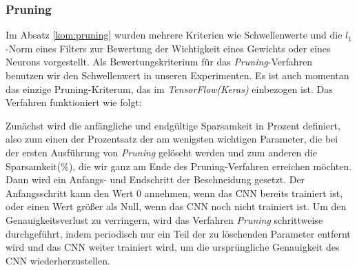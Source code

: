 \documentclass[12pt,a4paper]{scrartcl}
\numberwithin{equation}{section}
\begin{document}
\subsubsection{Pruning}\label{exp:pruning}
Im Absatz \ref{kom:pruning} wurden mehrere Kriterien wie Schwellenwerte und die $ l_1 $-Norm eines Filters zur Bewertung der Wichtigkeit eines Gewichts oder eines Neurons  vorgestellt. Als Bewertungskriterium für das \textit{Pruning}-Verfahren benutzen wir den Schwellenwert in unseren Experimenten. Es ist auch momentan das einzige Pruning-Kriterum, das im \textit{TensorFlow(Keras)} einbezogen ist. Das Verfahren funktioniert wie folgt:

Zunächst wird die anfängliche und endgültige Sparsamkeit in Prozent definiert, also zum einen der Prozentsatz der am wenigsten wichtigen Parameter, die bei der ersten Ausführung von \textit{Pruning} gelöscht werden und zum anderen die Sparsamkeit(\%), die wir ganz am Ende des Pruning-Verfahren erreichen möchten. Dann wird ein Anfangs- und Endschritt der Beschneidung gesetzt. Der Anfangsschritt kann den Wert $ 0 $ annehmen, wenn das \ac{CNN} bereits trainiert ist, oder einen Wert größer als Null, wenn das \ac{CNN} noch nicht trainiert ist. Um den Genauigkeitsverlust zu verringern, wird das Verfahren \textit{Pruning} schrittweise durchgeführt, indem periodisch nur ein Teil der zu löschenden Parameter entfernt wird und das CNN weiter trainiert wird, um die ursprüngliche Genauigkeit des CNN wiederherzustellen. 
\end{document}

